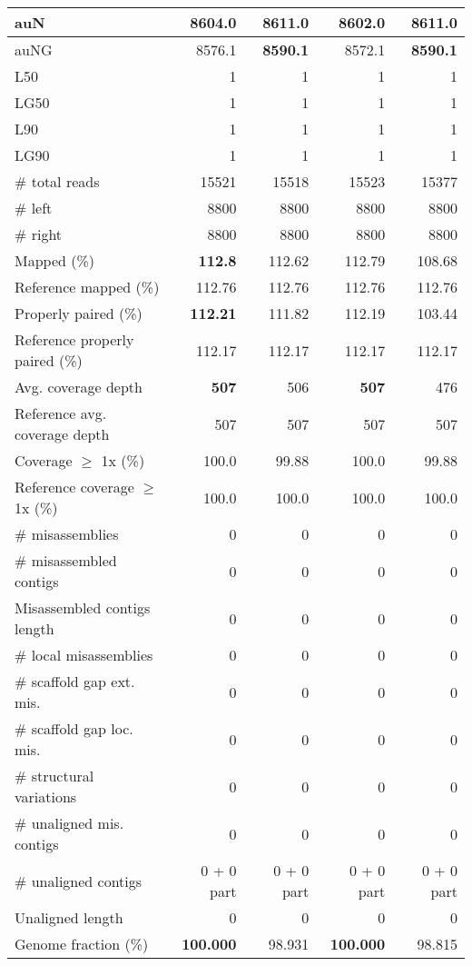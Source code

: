 \documentclass[12pt,a4paper]{article}
\begin{document}
\begin{table}[ht]
\begin{center}
\begin{tabular}{|l*{4}{|r}|}
auN & 8604.0 & {\bf 8611.0} & 8602.0 & {\bf 8611.0} \\ \hline
auNG & 8576.1 & {\bf 8590.1} & 8572.1 & {\bf 8590.1} \\ \hline
L50 & 1 & 1 & 1 & 1 \\ \hline
LG50 & 1 & 1 & 1 & 1 \\ \hline
L90 & 1 & 1 & 1 & 1 \\ \hline
LG90 & 1 & 1 & 1 & 1 \\ \hline
\# total reads & 15521 & 15518 & 15523 & 15377 \\ \hline
\# left & 8800 & 8800 & 8800 & 8800 \\ \hline
\# right & 8800 & 8800 & 8800 & 8800 \\ \hline
Mapped (\%) & {\bf 112.8} & 112.62 & 112.79 & 108.68 \\ \hline
Reference mapped (\%) & 112.76 & 112.76 & 112.76 & 112.76 \\ \hline
Properly paired (\%) & {\bf 112.21} & 111.82 & 112.19 & 103.44 \\ \hline
Reference properly paired (\%) & 112.17 & 112.17 & 112.17 & 112.17 \\ \hline
Avg. coverage depth & {\bf 507} & 506 & {\bf 507} & 476 \\ \hline
Reference avg. coverage depth & 507 & 507 & 507 & 507 \\ \hline
Coverage $\geq$ 1x (\%) & 100.0 & 99.88 & 100.0 & 99.88 \\ \hline
Reference coverage $\geq$ 1x (\%) & 100.0 & 100.0 & 100.0 & 100.0 \\ \hline
\# misassemblies & 0 & 0 & 0 & 0 \\ \hline
\# misassembled contigs & 0 & 0 & 0 & 0 \\ \hline
Misassembled contigs length & 0 & 0 & 0 & 0 \\ \hline
\# local misassemblies & 0 & 0 & 0 & 0 \\ \hline
\# scaffold gap ext. mis. & 0 & 0 & 0 & 0 \\ \hline
\# scaffold gap loc. mis. & 0 & 0 & 0 & 0 \\ \hline
\# structural variations & 0 & 0 & 0 & 0 \\ \hline
\# unaligned mis. contigs & 0 & 0 & 0 & 0 \\ \hline
\# unaligned contigs & 0 + 0 part & 0 + 0 part & 0 + 0 part & 0 + 0 part \\ \hline
Unaligned length & 0 & 0 & 0 & 0 \\ \hline
Genome fraction (\%) & {\bf 100.000} & 98.931 & {\bf 100.000} & 98.815 \\ \hline

\end{tabular}
\end{center}
\end{table}
\end{document}
